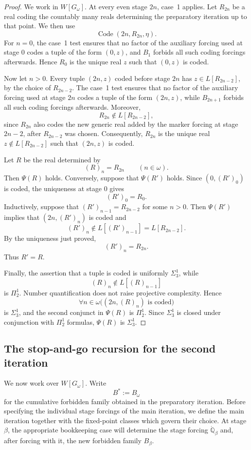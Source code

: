 \documentclass[a4paper,11pt]{article}
\newcommand{\forceQ}{\mathbb{Q}}
\begin{document}
\begin{proof}
We work in $W[G_\omega]$. At every even stage $2n$, case~1 applies. Let $R_{2n}$ be a real coding the countably many reals determining the preparatory iteration up to that point. We then use
\[
\operatorname{Code}(2n,R_{2n},\eta).
\]
For $n=0$, the case~1 test ensures that no factor of the auxiliary forcing used at stage $0$ codes a tuple of the form $(0,z)$, and $B_1$ forbids all such coding forcings afterwards. Hence $R_0$ is the unique real $z$ such that $(0,z)$ is coded.

Now let $n>0$. Every tuple $(2n,z)$ coded before stage $2n$ has $z\in L[R_{2n-2}]$, by the choice of $R_{2n-2}$. The case~1 test ensures that no factor of the auxiliary forcing used at stage $2n$ codes a tuple of the form $(2n,z)$, while $B_{2n+1}$ forbids all such coding forcings afterwards. Moreover,
\[
R_{2n}\notin L[R_{2n-2}],
\]
since $R_{2n}$ also codes the new generic real added by the marker forcing at stage $2n-2$, after $R_{2n-2}$ was chosen. Consequently, $R_{2n}$ is the unique real $z\notin L[R_{2n-2}]$ such that $(2n,z)$ is coded.

Let $R$ be the real determined by
\[
(R)_n=R_{2n}
\qquad(n\in\omega).
\]
Then $\Psi(R)$ holds. Conversely, suppose that $\Psi(R')$ holds. Since $(0,(R')_0)$ is coded, the uniqueness at stage $0$ gives
\[
(R')_0=R_0.
\]
Inductively, suppose that $(R')_{n-1}=R_{2n-2}$ for some $n>0$. Then $\Psi(R')$ implies that $(2n,(R')_n)$ is coded and
\[
(R')_n\notin L[(R')_{n-1}]=L[R_{2n-2}].
\]
By the uniqueness just proved,
\[
(R')_n=R_{2n}.
\]
Thus $R'=R$.

Finally, the assertion that a tuple is coded is uniformly $\Sigma^1_3$, while
\[
(R)_n\notin L[(R)_{n-1}]
\]
is $\Pi^1_2$. Number quantification does not raise projective complexity. Hence
\[
\forall n\in\omega\bigl((2n,(R)_n)\text{ is coded}\bigr)
\]
is $\Sigma^1_3$, and the second conjunct in $\Psi(R)$ is $\Pi^1_2$. Since $\Sigma^1_3$ is closed under conjunction with $\Pi^1_2$ formulas, $\Psi(R)$ is $\Sigma^1_3$.
\end{proof}
\subsection{The stop-and-go recursion for the second iteration}

We now work over $W[G_\omega]$. Write
\[
B^*:=B_\omega
\]
for the cumulative forbidden family obtained in the preparatory iteration. Before specifying the individual stage forcings of the main iteration, we define the main iteration together with the fixed-point classes which govern their choice. At stage $\beta$, the appropriate bookkeeping case will determine the stage forcing $\dot{\forceQ}_\beta$ and, after forcing with it, the new forbidden family $B_\beta$. 
\end{document}
